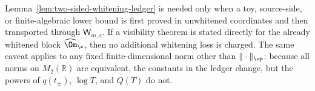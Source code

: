 \begin{remark}
\label{rem:when-two-sided-whitening-ledger-is-consumed}
Lemma~\ref{lem:two-sided-whitening-ledger} is needed only when a toy,
source-side, or finite-algebraic lower bound is first proved in
unwhitened coordinates and then transported through
\(\mathsf W_{m,s}\).  If a visibility theorem is stated directly for the
already whitened block \(\widehat\Om_\z\), then no additional whitening
loss is charged.  The same caveat applies to any fixed finite-dimensional
norm other than \(\|\cdot\|_{\op}\): because all norms on \(M_2(\mathbb R)\)
are equivalent, the constants in the ledger change, but the powers of
\(q(t_\pm)\), \(\log T\), and \(Q(T)\) do not.
\end{remark}
